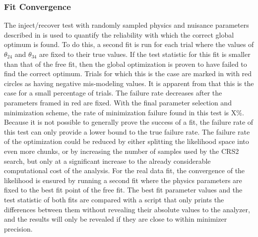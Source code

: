 
\subsubsection{Fit Convergence}

The inject/recover test with randomly sampled physics and nuisance parameters described in  is used to quantify the reliability with which the correct global optimum is found. To do this, a second fit is run for each trial where the values of $\theta_{24}$ and $\theta_{34}$ are fixed to their true values. If the test statistic for this fit is smaller than that of the free fit, then the global optimization is proven to have failed to find the correct optimum. Trials for which this is the case are marked in  with red circles as having negative mis-modeling values. It is apparent from  that this is the case for a small percentage of trials. The failure rate decreases after the parameters framed in red are fixed. With the final parameter selection and minimization scheme, the rate of minimization failure found in this test is X\%. Because it is not possible to generally prove the success of a fit, the failure rate of this test can only provide a lower bound to the true failure rate. The failure rate of the optimization could be reduced by either splitting the likelihood space into even more chunks, or by increasing the number of samples used by the \textsc{CRS2} search, but only at a significant increase to the already considerable computational cost of the analysis. For the real data fit, the convergence of the likelihood is ensured by running a second fit where the physics parameters are fixed to the best fit point of the free fit. The best fit parameter values and the test statistic of both fits are compared with a script that only prints the differences between them without revealing their absolute values to the analyzer, and the results will only be revealed if they are close to within minimizer precision.

